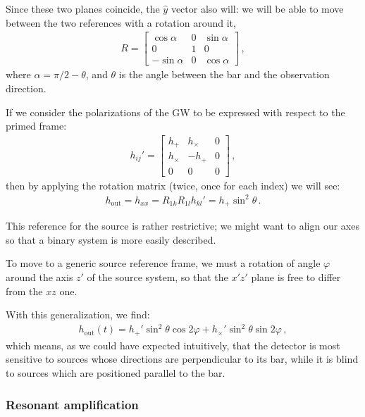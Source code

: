 \documentclass[main.tex]{subfiles}
\begin{document}
Since these two planes coincide, the \(\hat{y}\) vector also will: we will be able to move between the two references with a rotation around it, 
%
\begin{align}
R = \left[\begin{array}{ccc}
\cos \alpha  & 0 & \sin \alpha  \\ 
0 & 1 & 0 \\ 
- \sin \alpha  & 0 & \cos \alpha 
\end{array}\right]
\,,
\end{align}
%
where \(\alpha = \pi /2 - \theta \), and \(\theta \) is the angle between the bar and the observation direction. 

If we consider the polarizations of the GW to be expressed with respect to the primed frame: 
%
\begin{align}
h_{ij}' = \left[\begin{array}{ccc}
h_{+} & h_{ \times } & 0 \\ 
h_{ \times } & -h_{+} & 0 \\ 
0 & 0 & 0
\end{array}\right]
\,,
\end{align}
%
then by applying the rotation matrix (twice, once for each index) we will see:
%
\begin{align}
h _{\text{out}} = h_{xx} = 
R_{1k} R_{1l} h_{kl}'
= h_{+} \sin^2\theta 
\,.
\end{align}

This reference for the source is rather restrictive; we might want to align our axes so that a binary system is more easily described. 

To move to a generic source reference frame, we must a rotation of angle \(\varphi \) around the axis \(z'\) of the source system, so that the \(x' z'\) plane is free to differ from the \(xz\) one. 

With this generalization, we find:
%
\begin{align}
h _{\text{out}} (t) = h_{+}' \sin^2\theta \cos 2 \varphi + h_{ \times }' \sin^2 \theta \sin 2 \varphi 
\,,
\end{align}
%
which means, as we could have expected intuitively, that the detector is most sensitive to sources whose directions are perpendicular to its bar, while it is blind to sources which are positioned parallel to the bar. 

\subsubsection{Resonant amplification}
\end{document}
